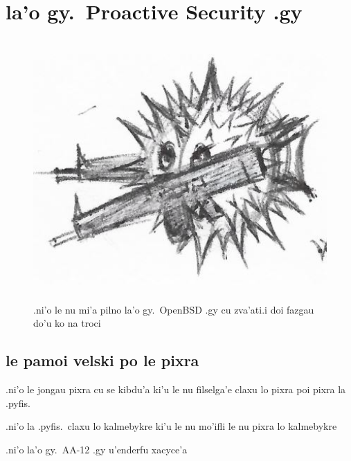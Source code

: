 \documentclass{report}
\begin{document}
\chapter{la'o gy.\ Proactive Security .gy}
\begin{figure}[ht]
	\centering
	\includegraphics[height=10cm]{proactivesecurity/proactivesecurity.png}
	\caption[center]{.ni'o le nu mi'a pilno la'o gy.\ OpenBSD .gy cu zva'ati\@  .i doi fazgau do'u ko na troci}
\end{figure}
\section{le pamoi velski po le pixra}
.ni'o le jongau pixra cu se kibdu'a ki'u le nu filselga'e claxu lo pixra poi pixra la .pyfis.

.ni'o la .pyfis.\ claxu lo kalmebykre ki'u le nu mo'ifli le nu pixra lo kalmebykre

.ni'o la'o gy.\ AA-12 .gy u'enderfu xacyce'a
\end{document}
